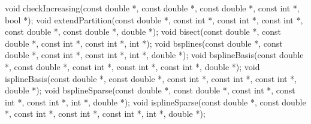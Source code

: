 \documentclass[
  12pt,
]{book}
\newenvironment{Shaded}{\begin{snugshade}}{\end{snugshade}}
\newcommand{\DataTypeTok}[1]{\textcolor[rgb]{0.13,0.29,0.53}{#1}}
\newcommand{\NormalTok}[1]{#1}
\theoremstyle{definition}
\theoremstyle{definition}
\theoremstyle{definition}
\theoremstyle{definition}
\theoremstyle{remark}
\begin{document}
\begin{Shaded}
\begin{Highlighting}[]
\DataTypeTok{void}\NormalTok{ checkIncreasing(}\DataTypeTok{const} \DataTypeTok{double}\NormalTok{ *, }\DataTypeTok{const} \DataTypeTok{double}\NormalTok{ *, }\DataTypeTok{const} \DataTypeTok{double}\NormalTok{ *,}
                     \DataTypeTok{const} \DataTypeTok{int}\NormalTok{ *, }\DataTypeTok{bool}\NormalTok{ *);}
\DataTypeTok{void}\NormalTok{ extendPartition(}\DataTypeTok{const} \DataTypeTok{double}\NormalTok{ *, }\DataTypeTok{const} \DataTypeTok{int}\NormalTok{ *, }\DataTypeTok{const} \DataTypeTok{int}\NormalTok{ *, }\DataTypeTok{const} \DataTypeTok{int}\NormalTok{ *,}
                     \DataTypeTok{const} \DataTypeTok{double}\NormalTok{ *, }\DataTypeTok{const} \DataTypeTok{double}\NormalTok{ *, }\DataTypeTok{double}\NormalTok{ *);}
\DataTypeTok{void}\NormalTok{ bisect(}\DataTypeTok{const} \DataTypeTok{double}\NormalTok{ *, }\DataTypeTok{const} \DataTypeTok{double}\NormalTok{ *, }\DataTypeTok{const} \DataTypeTok{int}\NormalTok{ *, }\DataTypeTok{const} \DataTypeTok{int}\NormalTok{ *, }\DataTypeTok{int}\NormalTok{ *);}
\DataTypeTok{void}\NormalTok{ bsplines(}\DataTypeTok{const} \DataTypeTok{double}\NormalTok{ *, }\DataTypeTok{const} \DataTypeTok{double}\NormalTok{ *, }\DataTypeTok{const} \DataTypeTok{int}\NormalTok{ *, }\DataTypeTok{const} \DataTypeTok{int}\NormalTok{ *, }\DataTypeTok{int}\NormalTok{ *,}
              \DataTypeTok{double}\NormalTok{ *);}
\DataTypeTok{void}\NormalTok{ bsplineBasis(}\DataTypeTok{const} \DataTypeTok{double}\NormalTok{ *, }\DataTypeTok{const} \DataTypeTok{double}\NormalTok{ *, }\DataTypeTok{const} \DataTypeTok{int}\NormalTok{ *, }\DataTypeTok{const} \DataTypeTok{int}\NormalTok{ *,}
                  \DataTypeTok{const} \DataTypeTok{int}\NormalTok{ *, }\DataTypeTok{double}\NormalTok{ *);}
\DataTypeTok{void}\NormalTok{ isplineBasis(}\DataTypeTok{const} \DataTypeTok{double}\NormalTok{ *, }\DataTypeTok{const} \DataTypeTok{double}\NormalTok{ *, }\DataTypeTok{const} \DataTypeTok{int}\NormalTok{ *, }\DataTypeTok{const} \DataTypeTok{int}\NormalTok{ *,}
                  \DataTypeTok{const} \DataTypeTok{int}\NormalTok{ *, }\DataTypeTok{double}\NormalTok{ *);}
\DataTypeTok{void}\NormalTok{ bsplineSparse(}\DataTypeTok{const} \DataTypeTok{double}\NormalTok{ *, }\DataTypeTok{const} \DataTypeTok{double}\NormalTok{ *, }\DataTypeTok{const} \DataTypeTok{int}\NormalTok{ *, }\DataTypeTok{const} \DataTypeTok{int}\NormalTok{ *,}
                   \DataTypeTok{const} \DataTypeTok{int}\NormalTok{ *, }\DataTypeTok{int}\NormalTok{ *, }\DataTypeTok{double}\NormalTok{ *);}
\DataTypeTok{void}\NormalTok{ isplineSparse(}\DataTypeTok{const} \DataTypeTok{double}\NormalTok{ *, }\DataTypeTok{const} \DataTypeTok{double}\NormalTok{ *, }\DataTypeTok{const} \DataTypeTok{int}\NormalTok{ *, }\DataTypeTok{const} \DataTypeTok{int}\NormalTok{ *,}
                   \DataTypeTok{const} \DataTypeTok{int}\NormalTok{ *, }\DataTypeTok{int}\NormalTok{ *, }\DataTypeTok{double}\NormalTok{ *);}


\end{Highlighting}
\end{Shaded}
\end{document}
